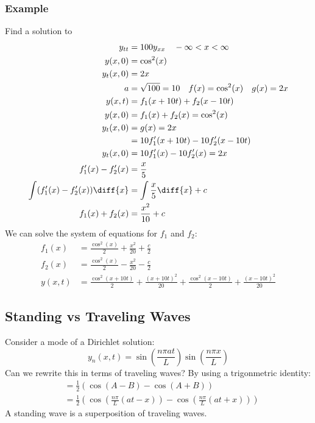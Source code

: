 \documentclass{math}
\begin{document}
\subsubsection*{Example}
Find a solution to
\begin{align*}
  y_{tt} &= 100y_{xx} \quad -\infty<x<\infty \\
  y(x,0) &= \cos^2(x) \\
  y_t(x,0) &= 2x \\
  a &= \sqrt{100} = 10 \quad f(x) = \cos^2(x) \quad g(x) = 2x \\
  y(x,t) &= f_1(x+10t)+f_2(x-10t) \\
  y(x,0) &= f_1(x)+f_2(x) = \cos^2(x) \\
  y_t(x,0) &= g(x) = 2x \\
  &= 10f_1'(x+10t)-10f_2'(x-10t) \\
  y_t(x,0) &= 10f_1'(x)-10f_2'(x) = 2x \\
  f_1'(x)-f_2'(x) &= \frac{x}{5} \\
  \int(f_1'(x)-f_2'(x))\diff{x} &= \int\frac{x}{5}\diff{x}+c \\
  f_1(x)+f_2(x) &= \frac{x^2}{10}+c
\end{align*}
We can solve the system of equations for \( f_1 \) and \( f_2 \):
\begin{align*}
  f_1(x) &= \frac{\cos^2(x)}{2}+\frac{x^2}{20}+\frac{c}{2} \\
  f_2(x) &= \frac{\cos^2(x)}{2}-\frac{x^2}{20}-\frac{c}{2} \\
  y(x,t) &= \frac{\cos^2(x+10t)}{2}+\frac{(x+10t)^2}{20}+
    \frac{\cos^2(x-10t)}{2}+\frac{(x-10t)^2}{20}
\end{align*}

\subsection*{Standing vs Traveling Waves}
Consider a mode of a Dirichlet solution:
\[ y_n(x,t) = \sin(\frac{n\pi at}{L})\sin(\frac{n\pi x}{L}) \]
Can we rewrite this in terms of traveling waves? By using a trigonmetric
identity:
\begin{align*}
  &= \frac{1}{2}(\cos(A-B)-\cos(A+B)) \\
  &= \frac{1}{2}(\cos(\frac{n\pi}{L}(at-x))-\cos(\frac{n\pi}{L}(at+x)))
\end{align*}
A standing wave is a superposition of traveling waves.
\end{document}
